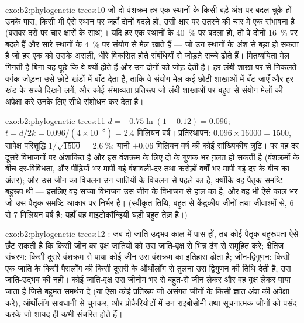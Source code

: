 \begin{solution}{exo:b2:phylogenetic-trees:10}
जो दो वंशक्रम हर एक स्थानों के किसी बड़े अंश पर बदल चुके हों
उनके पास, किसी भी ऐसे स्थान पर जहाँ दोनों बदले हों, उसी क्षार पर
उतरने की चार में एक संभावना है (बराबर दरों पर चार क्षारों के साथ)। यदि हर एक
स्थानों के \qty{40}{\%} पर बदला हो, तो वे दोनों
\qty{16}{\%} पर बदले हैं और सारे स्थानों के \qty{4}{\%} पर संयोग से मेल खाते हैं ---
जो उन स्थानों के अंश से बड़ा हो सकता है जो हर एक को उसके असली, धीरे विकसित होते
संबंधियों से जोड़ते सच्चे  ढोते हैं।
मितव्ययिता मेल गिनती है बिना यह पूछे कि वे क्यों होते हैं
और उन दोनों को जोड़ देती है। हर लंबी शाखा पर से निकलते वर्गक जोड़ना
उसे छोटे खंडों में बाँट देता है, ताकि वे
संयोग-मेल कई छोटी शाखाओं में बँट जाएँ और
हर खंड के सच्चे  दिखने लगें; और कोई
संभाव्यता-प्रतिरूप जो लंबी शाखाओं पर बहुत-से संयोग-मेलों की अपेक्षा करे
उनके लिए सीधे संशोधन कर देता है।
\end{solution}

\begin{solution}{exo:b2:phylogenetic-trees:11}
$d = -0.75\ln(1 - 0.12) = 0.096$; $t = d/2k = 0.096/(4\times 10^{-8})
= 2.4$ मिलियन वर्ष। प्रतिस्थापन: $0.096\times \num{16000} =
1500$, सापेक्ष परिशुद्धि $1/\sqrt{1500} = \qty{2.6}{\%}$: यानी
$\pm 0.06$ मिलियन वर्ष की कोई सांख्यिकीय त्रुटि। पर वह दर
दूसरे विभाजनों पर अंशांकित है और इस वंशक्रम के लिए दो के गुणक भर
ग़लत हो सकती है (वंशक्रमों के बीच दर-विविधता, और पीढ़ियों भर मापी गई
वंशावली-दर तथा करोड़ों वर्षों भर मापी गई दर के
बीच का अंतर); और उस जीन का
विचलन उन जातियों के विचलन से पहले का है, क्योंकि वह पैतृक
समष्टि बहुरूप थी --- इसलिए वह सच्चा विभाजन उस जीन के विभाजन से
हाल का है, और वह भी ऐसे काल भर जो उस पैतृक
समष्टि-आकार पर निर्भर है। (स्वीकृत तिथि, बहुत-से केंद्रकीय जीनों तथा
जीवाश्मों से, 6 से 7 मिलियन वर्ष है: यहाँ वह माइटोकॉन्ड्रियी घड़ी
बहुत तेज़ है।)
\end{solution}

\begin{solution}{exo:b2:phylogenetic-trees:12}
: जब दो जाति-उद्भव काल में पास हों, तब
कोई पैतृक बहुरूपता ऐसे छँट सकती है कि किसी जीन का वृक्ष
जातियों को उस जाति-वृक्ष से भिन्न ढंग से समूहित करे; क्षैतिज
संचरण: किसी दूसरे वंशक्रम से पाया कोई जीन उस
वंशक्रम का इतिहास ढोता है; जीन-द्विगुणन: किसी एक जाति के किसी पैरालॉग की
किसी दूसरी के ऑर्थोलॉग से तुलना उस द्विगुणन की
तिथि देती है, उस जाति-उद्भव की नहीं। कोई जाति-वृक्ष
उस जीनोम भर से बहुत-से जीन लेकर और वह वृक्ष लेकर पाया जाता है जिसे बहुमत
समर्थन दे (या ऐसा कोई प्रतिरूप जो असंगत जीनों के किसी ज्ञात अंश की अपेक्षा करे),
ऑर्थोलॉग सावधानी से चुनकर, और
प्रोकैरियोटों में उन राइबोसोमी तथा सूचनात्मक जीनों को पसंद करके जो शायद ही कभी
संचरित होते हैं।
\end{solution}

